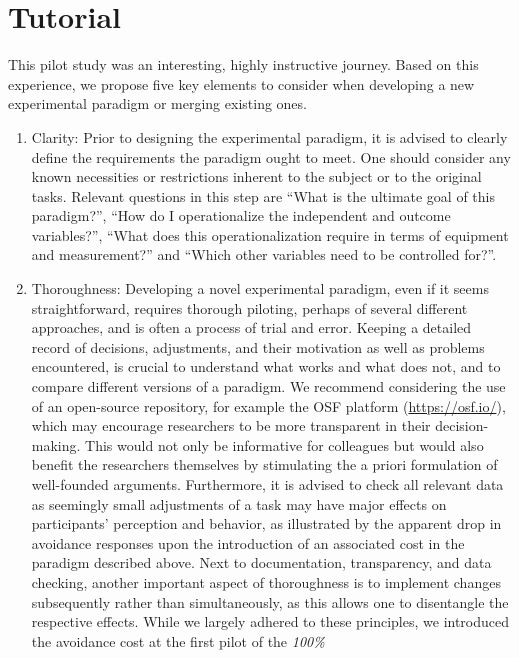 \documentclass[twocolumn, serif, authordate, empirical]{jote-article}
\begin{document}
 {}\section*{Tutorial} 

This pilot study was an interesting, highly instructive journey. Based on this experience, we propose five key elements to consider when developing a new experimental paradigm or merging existing ones.~

\begin{enumerate}
\item   Clarity: Prior to designing the experimental paradigm, it is advised   to clearly define the requirements the paradigm ought to meet. One   should consider any known necessities or restrictions inherent to the  subject or to the original tasks. Relevant questions in this step are   ``What is the ultimate goal of this paradigm?'', ``How do I   operationalize the independent and outcome variables?'', ``What does   this operationalization require in terms of equipment and   measurement?'' and ``Which other variables need to be controlled   for?''. \item   Thoroughness: Developing a novel experimental paradigm, even if it seems straightforward, requires thorough piloting, perhaps of several   different approaches, and is often a process of trial and error. Keeping a detailed record of decisions, adjustments, and their motivation as well as problems encountered, is crucial to understand what works and what does not, and to compare different versions of a paradigm. We recommend considering the use of an open-source repository, for example the OSF platform (\url{https://osf.io/}),  which may encourage researchers to be more transparent in their decision-making. This would not only be informative for colleagues but would also benefit the researchers themselves by stimulating the a priori formulation of well-founded arguments. Furthermore, it is advised to check all relevant data as seemingly small adjustments of a task may have major effects on participants' perception and behavior, as illustrated by the apparent drop in avoidance responses upon the introduction of an associated cost in the paradigm described above. Next to documentation, transparency, and data checking, another important aspect of thoroughness is to implement changes subsequently   rather than simultaneously, as this allows one to disentangle the   respective effects. While we largely adhered to these principles, we   introduced the avoidance cost at the first pilot of the \emph{100\%
}
\end{enumerate}
\end{document}

